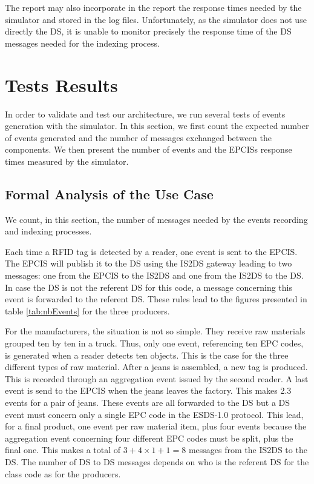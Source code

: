 \documentclass[a4paper]{llncs}
\begin{document}
The report may also incorporate in the report the response times needed by the
simulator and stored in the log files. 
Unfortunately, as the simulator does not use directly the DS, it is unable to monitor
precisely the response time of the DS messages needed for the indexing process.


\section{Tests Results}
\label{sec:tests}

In order to validate and test our architecture, we run several tests of events
generation with the simulator. In this section, we first count the expected number of events
generated and the number of messages exchanged between the components.
We then present the number of events and the EPCISs response times
measured by the simulator. 

\subsection{Formal Analysis of the Use Case}

We count, in this section, the number of messages needed by the events recording and
indexing processes. 
 
Each time a RFID tag is detected by a reader, one event is sent to the
EPCIS. The EPCIS will publish it to the DS using the IS2DS gateway leading to
two messages: one from the EPCIS to the IS2DS and one from the IS2DS to the
DS. In case the DS is not the referent DS for this code, a message concerning
this event is forwarded to the referent DS. These rules lead to the figures
presented in table \ref{tab:nbEvents} for the three producers.
 
For the manufacturers, the situation is not so simple. They receive raw
materials grouped ten by ten in a truck. Thus, only one event, referencing ten
EPC codes, is generated when a reader detects ten objects. This is the case for
the three different types of raw material. After a jeans is assembled, a new
tag is produced. This is recorded through an aggregation event issued by the
second reader. A last event is send to the EPCIS when the jeans leaves the
factory. This makes 2.3 events for a pair of jeans.  These events  are all forwarded to
the DS but a DS event must concern only a single EPC code in the ESDS-1.0
protocol. This lead, for a final product, one event per raw material item, plus
four events because the aggregation event concerning four different EPC codes
must be split, plus the final one. This makes a total of $3 + 4 \times 1 + 1 = 8 $ messages
from the IS2DS to the DS. The number of DS to DS messages depends on who is the
referent DS for the class code as for the producers.
\end{document}
